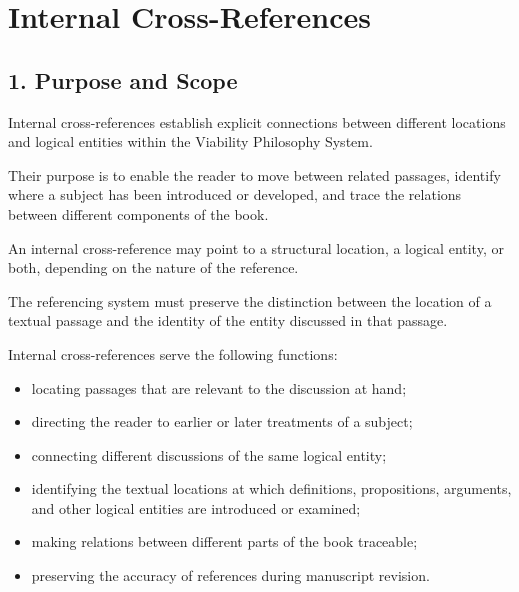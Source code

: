 
\cleardoublepage

\section*{Internal Cross-References}

{}


\subsection*{1. Purpose and Scope}

Internal cross-references establish explicit connections
between different locations and logical entities within
the Viability Philosophy System.

Their purpose is to enable the reader to move between
related passages, identify where a subject has been
introduced or developed, and trace the relations between
different components of the book.

An internal cross-reference may point to a structural
location, a logical entity, or both, depending on the
nature of the reference.

The referencing system must preserve the distinction
between the location of a textual passage and the identity
of the entity discussed in that passage.

Internal cross-references serve the following functions:

\begin{itemize}
    \item locating passages that are relevant to the
    discussion at hand;
    \item directing the reader to earlier or later
    treatments of a subject;
    \item connecting different discussions of the
    same logical entity;
    \item identifying the textual locations at which
    definitions, propositions, arguments, and other
    logical entities are introduced or examined;
    \item making relations between different parts
    of the book traceable;
    \item preserving the accuracy of references
    during manuscript revision.
\end{itemize}

